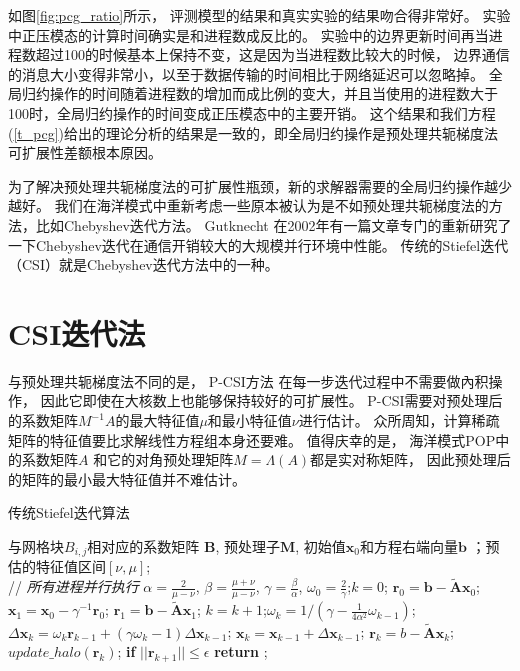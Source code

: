 如图\ref{fig:pcg_ratio}所示， 评测模型的结果和真实实验的结果吻合得非常好。 
实验中正压模态的计算时间确实是和进程数成反比的。 
实验中的边界更新时间再当进程数超过100的时候基本上保持不变，这是因为当进程数比较大的时候， 边界通信的消息大小变得非常小，以至于数据传输的时间相比于网络延迟可以忽略掉。 
全局归约操作的时间随着进程数的增加而成比例的变大，并且当使用的进程数大于100时，全局归约操作的时间变成正压模态中的主要开销。 
这个结果和我们方程(\ref{t_pcg})给出的理论分析的结果是一致的，即全局归约操作是预处理共轭梯度法可扩展性差额根本原因。 

为了解决预处理共轭梯度法的可扩展性瓶颈，新的求解器需要的全局归约操作越少越好。 
我们在海洋模式中重新考虑一些原本被认为是不如预处理共轭梯度法的方法，比如Chebyshev迭代方法。 
Gutknecht \cite{gutknecht2002chebyshev} 在2002年有一篇文章专门的重新研究了一下Chebyshev迭代在通信开销较大的大规模并行环境中性能。 
传统的Stiefel迭代（CSI）就是Chebyshev迭代方法中的一种。 


 
\section{CSI迭代法}
\label{solver:csi}
与预处理共轭梯度法不同的是， P-CSI方法 在每一步迭代过程中不需要做內积操作， 因此它即使在大核数上也能够保持较好的可扩展性。
P-CSI需要对预处理后的系数矩阵$M^{-1}A$的最大特征值$\mu$和最小特征值$\nu$进行估计。 
众所周知，计算稀疏矩阵的特征值要比求解线性方程组本身还要难。 
值得庆幸的是， 
海洋模式POP中的系数矩阵$A$ 和它的对角预处理矩阵$M = \Lambda(A)$都是实对称矩阵， 因此预处理后的矩阵的最小最大特征值并不难估计。 
 
\begin{algorithm}[h]
\caption{传统Stiefel迭代算法}
\label{alg:csi}
\begin{algorithmic}[1]
\REQUIRE 与网格块$B_{i,j}$相对应的系数矩阵 $\textbf{B}$, 预处理子$\textbf{M}$, 初始值$\textbf{x}_0$和方程右端向量$\textbf{b}$ ；预估的特征值区间$[\nu,\mu]$;  \\
 // \qquad    \textit{所有进程并行执行}
\STATE $\alpha =\frac{2}{\mu -\nu}$, $ \beta = \frac{\mu +\nu}{\mu -\nu}$, $\gamma = \frac{\beta}{\alpha}$, $\omega_0 =\frac{ 2}{\gamma}$;\quad $k = 0$;
\STATE $\textbf{r}_0 = \textbf{b}-\tilde{\textbf{A}}\textbf{x}_0$; $\textbf{x}_1 =\textbf{x}_0 -\gamma^{-1}\textbf{r}_0$; $\textbf{r}_1 =\textbf{b} -\tilde{\textbf{A}}\textbf{x}_1$;
\STATE $k=k+1$;\quad $\omega_k = 1/(\gamma - \frac{1}{4\alpha^2}\omega_{k-1})$; 
\STATE $\Delta \textbf{x}_{k} =\omega_k\textbf{r}_{k-1}+(\gamma \omega_k-1)\Delta \textbf{x}_{k-1}$;
\STATE $\textbf{x}_{k} =\textbf{x}_{k-1}+\Delta \textbf{x}_{k-1}$; \quad  $\textbf{r}_{k} =b- \tilde{\textbf{A}}\textbf{x}_{k}$;
\STATE $update\_halo(\textbf{r}_k)$; 
\STATE \textbf{if} $||\textbf{r}_{k+1}|| \le \epsilon$  \textbf{return} ;
\ENDIF\ENDWHILE
\end{algorithmic}
\end{algorithm}

